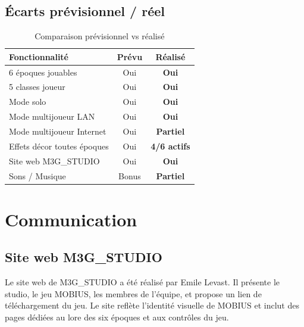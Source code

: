 \documentclass[12pt,a4paper]{article}
\begin{document}
\subsection{Écarts prévisionnel / réel}

\begin{table}[H]
\centering
\caption{Comparaison prévisionnel vs réalisé}
\renewcommand{\arraystretch}{1.4}
\begin{tabularx}{\textwidth}{@{}Xcc@{}}
\toprule
\rowcolor{tableheadbg}
\textbf{Fonctionnalité} & \textbf{Prévu} & \textbf{Réalisé} \\
\midrule
6 époques jouables            & Oui   & \textcolor{okgreen}{\textbf{Oui}} \\
\rowcolor{rowaltbg}
5 classes joueur              & Oui   & \textcolor{okgreen}{\textbf{Oui}} \\
Mode solo                     & Oui   & \textcolor{okgreen}{\textbf{Oui}} \\
\rowcolor{rowaltbg}
Mode multijoueur LAN          & Oui   & \textcolor{okgreen}{\textbf{Oui}} \\
Mode multijoueur Internet     & Oui   & \textcolor{warnorange}{\textbf{Partiel}} \\
\rowcolor{rowaltbg}
Effets décor toutes époques   & Oui   & \textcolor{warnorange}{\textbf{4/6 actifs}} \\
Site web M3G\_STUDIO          & Oui   & \textcolor{okgreen}{\textbf{Oui}} \\
\rowcolor{rowaltbg}
Sons / Musique                & Bonus & \textcolor{warnorange}{\textbf{Partiel}} \\
\bottomrule
\end{tabularx}
\end{table}

\newpage
\section{Communication}

\subsection{Site web M3G\_STUDIO}

Le site web de M3G\_STUDIO a été réalisé par Emile Levast. Il présente le studio, le jeu MOBIUS, les membres de l'équipe, et propose un lien de téléchargement du jeu. Le site reflète l'identité visuelle de MOBIUS et inclut des pages dédiées au lore des six époques et aux contrôles du jeu.
\end{document}

